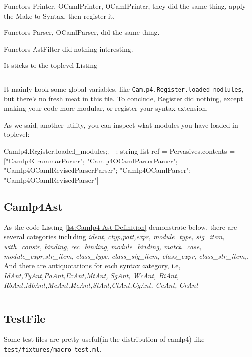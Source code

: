 Functors Printer, OCamlPrinter, OCamlPrinter, they did the same thing,
apply the Make to Syntax, then register it. 

Functors Parser, OCamlParser, did the same thing. 

Functors AstFilter  did nothing interesting.

It sticks to the toplevel Listing

\inputminted[fontsize=\scriptsize, firstline=123, lastline=126,
]{ocaml}{code/camp4/source/Register.ml}

It mainly hook some global variables, like
\verb|Camlp4.Register.loaded_modlules|, but there's no fresh meat in
this file.  To conclude, Register did nothing, except making your code
more modular, or register your syntax extension.

As we said, another utility, you can inspect what modules you have
loaded in toplevel:

\begin{ocamlcode}
Camlp4.Register.loaded_modules;;
- : string list ref =
{Pervasives.contents =
  ["Camlp4GrammarParser"; "Camlp4OCamlParserParser";
   "Camlp4OCamlRevisedParserParser"; "Camlp4OCamlParser";
   "Camlp4OCamlRevisedParser"]}
\end{ocamlcode}


\subsection{Camlp4Ast}

As the code Listing \ref{lst:Camlp4 Ast Definition} demonstrate below,
there are several categories including \textit{ident, ctyp,patt,expr,
  module\_type, sig\_item, with\_constr, binding, rec\_binding,
  module\_binding, match\_case, module\_expr,str\_item, class\_type,
  class\_sig\_item, class\_expr, class\_str\_item,}. And there are
antiquotations for each syntax category, i.e,
\textit{IdAnt,TyAnt,PaAnt,ExAnt,MtAnt, SgAnt, WcAnt, BiAnt,
  RbAnt,MbAnt,McAnt,MeAnt,StAnt,CtAnt,CgAnt, CeAnt, CrAnt}


\inputminted[fontsize=\scriptsize,
]{ocaml}{camlp4/code/ast/ast_def.ml}


\subsection{TestFile}
\label{sec:testfile}
Some test files are pretty useful(in the distribution of camlp4)
like \verb|test/fixtures/macro_test.ml|.
